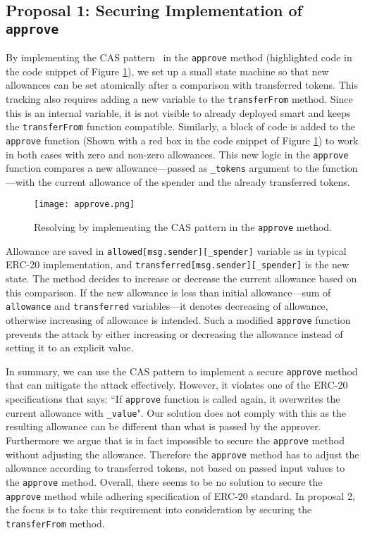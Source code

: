 \subsection{Proposal 1: Securing Implementation of \texttt{approve}}\label{subsec:prop1}
By implementing the CAS pattern~\cite{CompareSwap} in the \texttt{approve} method (highlighted code in the code snippet of Figure \ref{fig:approve}), we set up a small state machine so that new allowances can be set atomically after a comparison with transferred tokens. This tracking also requires adding a new variable to the \texttt{transferFrom} method. Since this is an internal variable, it is not visible to already deployed smart and keeps the \texttt{transferFrom} function compatible. Similarly, a block of code is added to the \texttt{approve} function (Shown with a red box in the code snippet of Figure \ref{fig:approve}) to work in both cases with zero and non-zero allowances. This new logic in the \texttt{approve} function compares a new allowance---passed as \texttt{\_tokens} argument to the function---with the current allowance of the spender and the already transferred tokens.

\begin{figure}[t]
	\centering
	\texttt{[image: approve.png]}
	\caption[Resolving \mwa in \texttt{approve}]{Resolving \mwa by implementing the CAS pattern in the \texttt{approve} method.}
	\label{fig:approve}
\end{figure}

Allowance are saved in \texttt{allowed[msg.sender][\_spender]} variable as in typical ERC-20 implementation, and \texttt{transferred[msg.sender][\_spender]} is the new state. The method decides to increase or decrease the current allowance based on this comparison. If the new allowance is less than initial allowance---sum of \texttt{allowance} and \texttt{transferred} variables---it denotes decreasing of allowance, otherwise increasing of allowance is intended. Such a modified \texttt{approve} function prevents the attack by either increasing or decreasing the allowance instead of setting it to an explicit value. 

In summary, we can use the CAS pattern to implement a secure \texttt{approve} method that can mitigate the attack effectively. However, it violates one of the ERC-20 specifications that says: ``If \texttt{approve} function is called again, it overwrites the current allowance with \texttt{\_value}". Our solution does not comply with this as the resulting allowance can be different than what is passed by the approver. Furthermore we argue that is in fact impossible to secure the \texttt{approve} method without adjusting the allowance. Therefore the \texttt{approve} method has to adjust the allowance according to transferred tokens, not based on passed input values to the \texttt{approve} method. Overall, there seems to be no solution to secure the \texttt{approve} method while adhering specification of ERC-20 standard. In proposal 2, the focus is to take this requirement into consideration by securing the \texttt{transferFrom} method.


